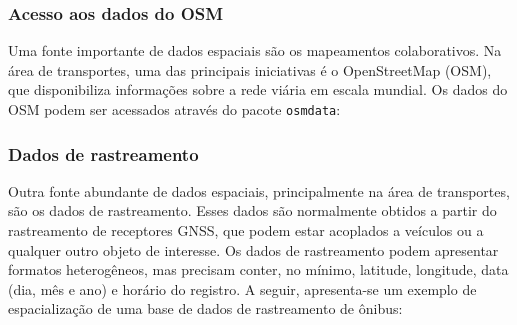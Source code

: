 \documentclass[
  letterpaper,
  DIV=11,
  numbers=noendperiod]{scrreprt}
\newenvironment{Shaded}{\begin{snugshade}}{\end{snugshade}}
\newcommand{\AttributeTok}[1]{\textcolor[rgb]{0.40,0.45,0.13}{#1}}
\newcommand{\CommentTok}[1]{\textcolor[rgb]{0.37,0.37,0.37}{#1}}
\newcommand{\FunctionTok}[1]{\textcolor[rgb]{0.28,0.35,0.67}{#1}}
\newcommand{\NormalTok}[1]{\textcolor[rgb]{0.00,0.23,0.31}{#1}}
\newcommand{\OtherTok}[1]{\textcolor[rgb]{0.00,0.23,0.31}{#1}}
\newcommand{\SpecialCharTok}[1]{\textcolor[rgb]{0.37,0.37,0.37}{#1}}
\newcommand{\StringTok}[1]{\textcolor[rgb]{0.13,0.47,0.30}{#1}}
\begin{document}
\subsubsection{\texorpdfstring{\textbf{Acesso aos dados do
OSM}}{Acesso aos dados do OSM}}\label{acesso-aos-dados-do-osm}

Uma fonte importante de dados espaciais são os mapeamentos
colaborativos. Na área de transportes, uma das principais iniciativas é
o OpenStreetMap (OSM), que disponibiliza informações sobre a rede viária
em escala mundial. Os dados do OSM podem ser acessados através do pacote
\texttt{osmdata}:

\begin{Shaded}
\end{Shaded}

\subsubsection{\texorpdfstring{\textbf{Dados de
rastreamento}}{Dados de rastreamento}}\label{dados-de-rastreamento}

Outra fonte abundante de dados espaciais, principalmente na área de
transportes, são os dados de rastreamento. Esses dados são normalmente
obtidos a partir do rastreamento de receptores GNSS, que podem estar
acoplados a veículos ou a qualquer outro objeto de interesse. Os dados
de rastreamento podem apresentar formatos heterogêneos, mas precisam
conter, no mínimo, latitude, longitude, data (dia, mês e ano) e horário
do registro. A seguir, apresenta-se um exemplo de espacialização de uma
base de dados de rastreamento de ônibus:
\end{document}
